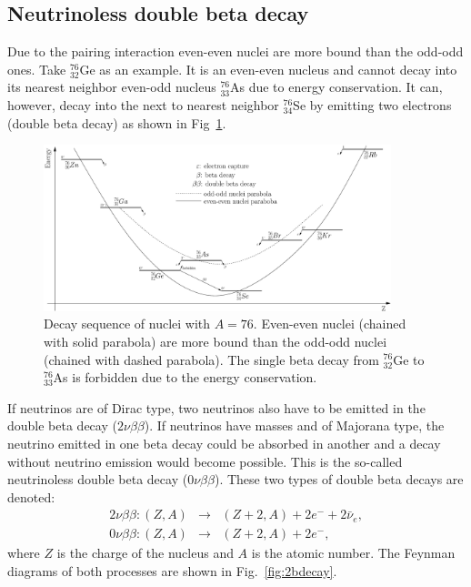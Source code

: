 \subsection{Neutrinoless double beta decay}
\label{sec:nonubb}
Due to the pairing interaction even-even nuclei are more bound than the odd-odd ones. Take $^{76}_{32}$Ge as an example. It is an even-even nucleus and cannot decay into its nearest neighbor even-odd nucleus $^{76}_{33}$As due to energy conservation. It can, however, decay into the next to nearest neighbor $^{76}_{34}$Se by emitting two electrons (double beta decay) as shown in Fig~\ref{fig:ee2oo}. 
\begin{figure}[tbhp]
  \centering
  \includegraphics[width=0.9\textwidth]{Espec0nu2b}  
  \caption{Decay sequence of nuclei with $A=76$. Even-even nuclei     (chained with solid parabola) are more bound than the odd-odd     nuclei (chained with dashed parabola). The single beta decay from     $^{76}_{32}$Ge to $^{76}_{33}$As is forbidden due to the energy     conservation.}
  \label{fig:ee2oo}
\end{figure}
If neutrinos are of Dirac type, two neutrinos also have to be emitted in the double beta decay ($2\nu\beta\beta$). If neutrinos have masses and of Majorana type, the neutrino emitted in one beta decay could be absorbed in another and a decay without neutrino emission would become possible. This is the so-called neutrinoless double beta decay ($0\nu\beta\beta$). These two types of double beta decays are denoted:
\begin{eqnarray}
  2\nu\beta\beta: (Z,A) &\rightarrow& (Z+2,A) + 2e^{-} +
  2\bar{\nu}_{e}, \\\label{eq:2nu2b}
  0\nu\beta\beta: (Z,A) &\rightarrow& (Z+2,A) + 2e^{-},
\label{eq:0nu2b}
\end{eqnarray}
where $Z$ is the charge of the nucleus and $A$ is the atomic number.
The Feynman diagrams of both processes are shown in
Fig.~\ref{fig:2bdecay}.
